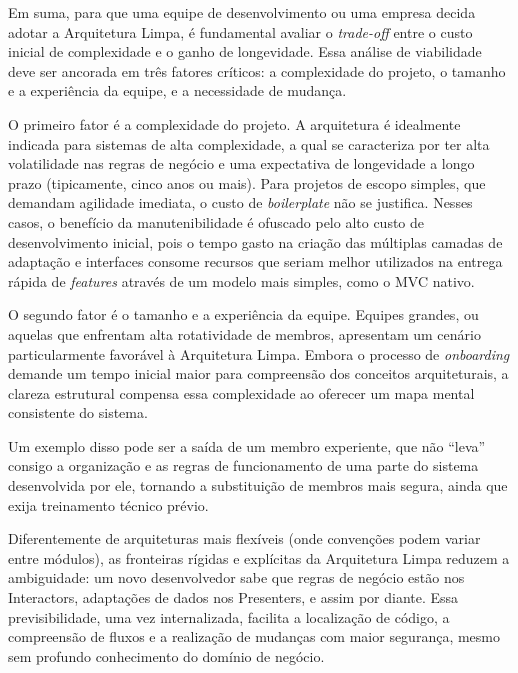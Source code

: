     \par Em suma, para que uma equipe de desenvolvimento ou uma empresa decida adotar a Arquitetura Limpa, é fundamental avaliar o \textit{trade-off} entre o custo inicial de complexidade e o ganho de longevidade. Essa análise de viabilidade deve ser ancorada em três fatores críticos: a complexidade do projeto, o tamanho e a experiência da equipe, e a necessidade de mudança.

    \par O primeiro fator é a complexidade do projeto. A arquitetura é idealmente indicada para sistemas de alta complexidade, a qual se caracteriza por ter alta volatilidade nas regras de negócio e uma expectativa de longevidade a longo prazo (tipicamente, cinco anos ou mais). Para projetos de escopo simples, que demandam agilidade imediata, o custo de \textit{boilerplate} não se justifica. Nesses casos, o benefício da manutenibilidade é ofuscado pelo alto custo de desenvolvimento inicial, pois o tempo gasto na criação das múltiplas camadas de adaptação e interfaces consome recursos que seriam melhor utilizados na entrega rápida de \textit{features} através de um modelo mais simples, como o MVC nativo.
    
    \par O segundo fator é o tamanho e a experiência da equipe. Equipes grandes, ou aquelas que enfrentam alta rotatividade de membros, apresentam um cenário particularmente favorável à Arquitetura Limpa. Embora o processo de \textit{onboarding} demande um tempo inicial maior para compreensão dos conceitos arquiteturais, a clareza estrutural compensa essa complexidade ao oferecer um mapa mental consistente do sistema.
    
    \par Um exemplo disso pode ser a saída de um membro experiente, que não ``leva'' consigo a organização e as regras de funcionamento de uma parte do sistema desenvolvida por ele, tornando a substituição de membros mais segura, ainda que exija treinamento técnico prévio.
    
    \par Diferentemente de arquiteturas mais flexíveis (onde convenções podem variar entre módulos), as fronteiras rígidas e explícitas da Arquitetura Limpa reduzem a ambiguidade: um novo desenvolvedor sabe que regras de negócio estão nos Interactors, adaptações de dados nos Presenters, e assim por diante. Essa previsibilidade, uma vez internalizada, facilita a localização de código, a compreensão de fluxos e a realização de mudanças com maior segurança, mesmo sem profundo conhecimento do domínio de negócio.

